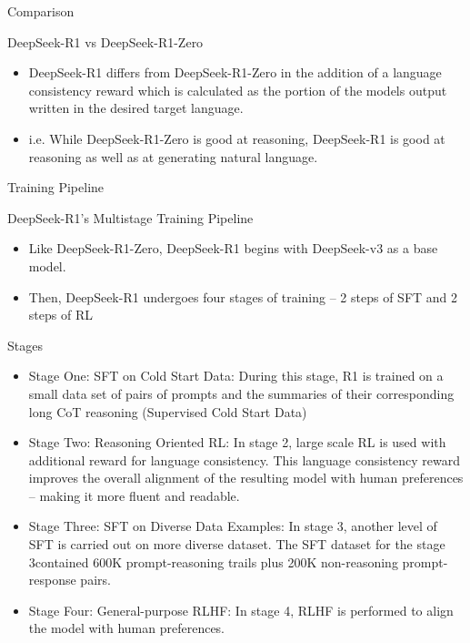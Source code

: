 \begin{frame}[fragile]{Comparison}

DeepSeek-R1 vs DeepSeek-R1-Zero

    \begin{itemize}
        \item    DeepSeek-R1 differs from DeepSeek-R1-Zero in the addition of a 
language consistency reward which is calculated as the portion of the 
models output written in the desired target language. 
        \item    i.e. While DeepSeek-R1-Zero is good at reasoning, DeepSeek-R1 is good 
at reasoning as well as at generating natural language.
    \end{itemize}
\end{frame}


\begin{frame}[fragile]{ Training Pipeline}

DeepSeek-R1's Multistage Training Pipeline

    \begin{itemize}
        \item     Like DeepSeek-R1-Zero, DeepSeek-R1 begins with DeepSeek-v3 as a 
base model. 
        \item     Then, DeepSeek-R1 undergoes four stages of training – 2 steps of SFT 
and 2 steps of RL
    \end{itemize}
\end{frame}

\begin{frame}[fragile]{ Stages}

    \begin{itemize}
        \item   Stage One: SFT on Cold Start Data:  During this stage, R1 is trained on a small data set of pairs of prompts and the summaries of their corresponding long CoT reasoning (Supervised Cold Start Data) 
		\item Stage Two: Reasoning Oriented RL: In stage 2, large scale RL is used with additional reward for language consistency.  This language consistency reward improves the overall alignment of 
the resulting model with human preferences – making it more fluent 
and readable. 
		\item Stage Three: SFT on Diverse Data Examples:  In stage 3, another level of SFT is carried out on more diverse dataset. The SFT dataset for the stage 3contained 600K prompt-reasoning trails 
plus 200K non-reasoning prompt-response pairs.
		\item Stage Four: General-purpose RLHF:  In stage 4, RLHF is performed to align the model with human 
preferences. 
    \end{itemize}
\end{frame}


